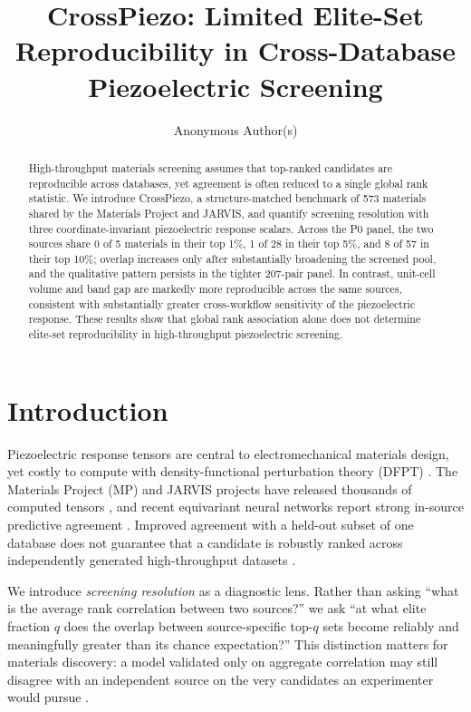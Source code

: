 \documentclass[11pt]{article}
\title{\textbf{CrossPiezo: Limited Elite-Set Reproducibility in Cross-Database Piezoelectric Screening}}
\author[1]{Anonymous Author(s)}
\affil[1]{Anonymous Institution}
\date{}
\begin{document}
\maketitle

\begin{abstract}
High-throughput materials screening assumes that top-ranked candidates are reproducible across databases, yet agreement is often reduced to a single global rank statistic.
We introduce CrossPiezo, a structure-matched benchmark of 573 materials shared by the Materials Project and JARVIS, and quantify screening resolution with three coordinate-invariant piezoelectric response scalars.
Across the P0 panel, the two sources share 0 of 5 materials in their top 1\%, 1 of 28 in their top 5\%, and 8 of 57 in their top 10\%; overlap increases only after substantially broadening the screened pool, and the qualitative pattern persists in the tighter 207-pair panel.
In contrast, unit-cell volume and band gap are markedly more reproducible across the same sources, consistent with substantially greater cross-workflow sensitivity of the piezoelectric response.
These results show that global rank association alone does not determine elite-set reproducibility in high-throughput piezoelectric screening.
\end{abstract}

\section{Introduction}
Piezoelectric response tensors are central to electromechanical materials design, yet costly to compute with density-functional perturbation theory (DFPT) \cite{baroni2001,choudhary2020ht}.
The Materials Project (MP) and JARVIS projects have released thousands of computed tensors \cite{dejong2015,choudhary2020}, and recent equivariant neural networks report strong in-source predictive agreement \cite{batzner2022,chen2022,choudhary2021,wen2024,dong2025}.
Improved agreement with a held-out subset of one database does not guarantee that a candidate is robustly ranked across independently generated high-throughput datasets \cite{choudhary2021uncertainty,choudhary2024leaderboard}.

We introduce \emph{screening resolution} as a diagnostic lens.
Rather than asking ``what is the average rank correlation between two sources?'' we ask ``at what elite fraction $q$ does the overlap between source-specific top-$q$ sets become reliably and meaningfully greater than its chance expectation?''
This distinction matters for materials discovery: a model validated only on aggregate correlation may still disagree with an independent source on the very candidates an experimenter would pursue \cite{yuan2018,ma2023,dong2025}.
\end{document}
